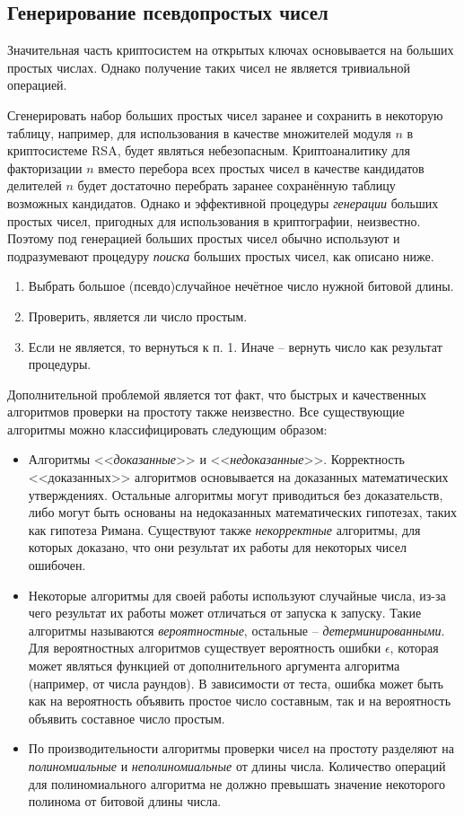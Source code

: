 \subsection{Генерирование псевдопростых чисел}

Значительная часть криптосистем на открытых ключах основывается на больших простых числах. Однако получение таких чисел не является тривиальной операцией.

Сгенерировать набор больших простых чисел заранее и сохранить в некоторую таблицу, например, для использования в качестве множителей модуля $n$ в криптосистеме RSA, будет являться небезопасным. Криптоаналитику для факторизации $n$ вместо перебора всех простых чисел в качестве кандидатов делителей $n$ будет достаточно перебрать заранее сохранённую таблицу возможных кандидатов. Однако и эффективной процедуры \emph{генерации} больших простых чисел, пригодных для использования в криптографии, неизвестно. Поэтому под генерацией больших простых чисел обычно используют и подразумевают процедуру \emph{поиска} больших простых чисел, как описано ниже.

\begin{enumerate}
	\item Выбрать большое (псевдо)случайное нечётное число нужной битовой длины.
	\item Проверить, является ли число простым.
	\item Если не является, то вернуться к п. 1. Иначе -- вернуть число как результат процедуры.
\end{enumerate}

Дополнительной проблемой является тот факт, что быстрых и качественных алгоритмов проверки на простоту также неизвестно. Все существующие алгоритмы можно классифицировать следующим образом:
\begin{itemize}
	\item Алгоритмы <<\emph{доказанные}>> и <<\emph{недоказанные}>>. Корректность <<доказанных>> алгоритмов основывается на доказанных математических утверждениях. Остальные алгоритмы могут приводиться без доказательств, либо могут быть основаны на недоказанных математических гипотезах, таких как гипотеза Римана. Существуют также \emph{некорректные} алгоритмы, для которых доказано, что они результат их работы для некоторых чисел ошибочен.
	\item Некоторые алгоритмы для своей работы используют случайные числа, из-за чего результат их работы может отличаться от запуска к запуску. Такие алгоритмы называются \emph{вероятностные}, остальные -- \emph{детерминированными}. Для вероятностных алгоритмов существует вероятность ошибки $\epsilon$, которая может являться функцией от дополнительного аргумента алгоритма (например, от числа раундов). В зависимости от теста, ошибка может быть как на вероятность объявить простое число составным, так и на вероятность объявить составное число простым.
	\item По производительности алгоритмы проверки чисел на простоту разделяют на \emph{полиномиальные} и \emph{неполиномиальные} от длины числа. Количество операций для полиномиального алгоритма не должно превышать значение некоторого полинома от битовой длины числа.
\end{itemize}

